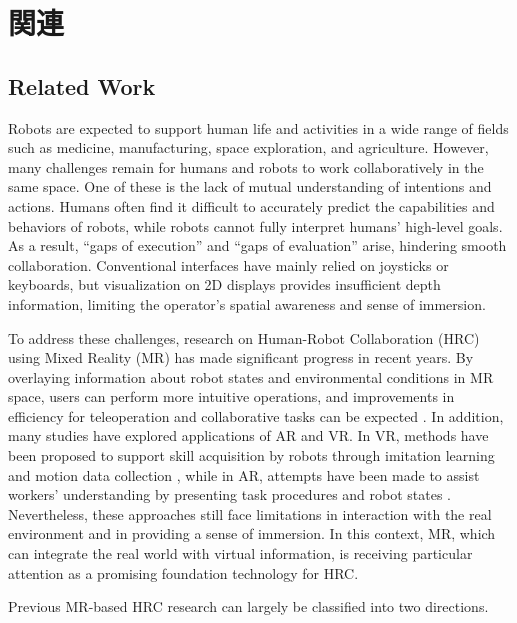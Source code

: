 \documentclass[../../main.tex]{subfiles} %
\begin{document}
\setcounter{page}{0} %

\chapter{関連}\label{chap:introduction}


\section{Related Work}

Robots are expected to support human life and activities in a wide range of 
fields such as medicine, manufacturing, space exploration, and agriculture.  
However, many challenges remain for 
humans and robots to work collaboratively in the same space.  
One of these is the lack of mutual understanding of intentions and actions.  
Humans often find it difficult to accurately predict the capabilities and behaviors of robots,
while robots cannot fully interpret humans’ high-level goals.  
As a result, “gaps of execution” and “gaps of evaluation” arise, hindering smooth collaboration.  
Conventional interfaces have mainly relied on joysticks or keyboards, but visualization on 2D displays 
provides insufficient depth information, 
limiting the operator’s spatial awareness and sense of immersion.

To address these challenges, research on Human-Robot Collaboration (HRC) using Mixed Reality (MR) 
has made significant progress in recent years.  
By overlaying information about robot states and environmental conditions in MR space, 
users can perform more intuitive operations, 
and improvements in efficiency for teleoperation and collaborative tasks can be expected \cite{ref1,ref2}.  
In addition, many studies have explored applications of AR and VR.  
In VR, methods have been proposed to support skill acquisition by robots through 
imitation learning and motion data collection \cite{refX},  
while in AR, attempts have been made to assist workers’ understanding by presenting 
task procedures and robot states \cite{refY}.  
Nevertheless, these approaches still face limitations in interaction with the real 
environment and in providing a sense of immersion.  
In this context, MR, which can integrate the real world with virtual information, 
is receiving particular attention as a promising foundation technology for HRC.

Previous MR-based HRC research can largely be classified into two directions.
\end{document}

